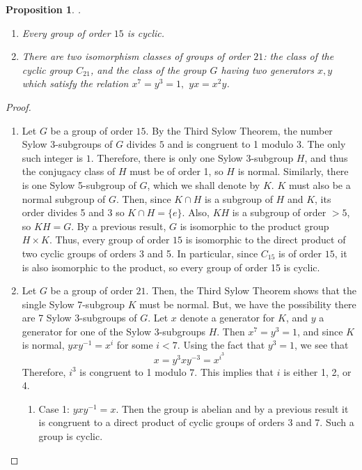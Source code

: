 \documentclass[12pt]{article}
\newtheorem{prop}[thm]{Proposition}
\theoremstyle{definition}
\theoremstyle{remark}
\numberwithin{equation}{section}
\begin{document}
\begin{prop}
        .\newline \begin{enumerate}
                \item Every group of order $15$ is cyclic.
                \item There are two isomorphism classes of groups of order $21$: the class of the cyclic group $C_{21}$, and the class of the group $G$ having two generators $x,y$ which satisfy the relation $x^7=y^3=1,$ $yx = x^2y$.
        \end{enumerate}
\end{prop}
\begin{proof}
        \begin{enumerate}
                \item Let $G$ be a group of order $15$. By the Third Sylow Theorem, the number Sylow 3-subgroups of $G$ divides $5$ and is congruent to 1 modulo 3. The only such integer is $1$. Therefore, there is only one Sylow 3-subgroup $H$, and thus the conjugacy class of $H$ must be of order 1, so $H$ is normal. Similarly, there is one Sylow 5-subgroup of $G$, which we shall denote by $K$. $K$ must also be a normal subgroup of $G$. Then, since $K\cap H$ is a subgroup of $H$ and $K$, its order divides 5 and 3 so $K \cap H = \{e\}$. Also, $KH$ is a subgroup of order $> 5$, so $KH = G$. By a previous result, $G$ is isomorphic to the product group $H\times K$. Thus, every group of order $15$ is isomorphic to the direct product of two cyclic groups of orders 3 and 5. In particular, since $C_{15}$ is of order $15$, it is also isomorphic to the product, so every group of order 15 is cyclic.
                \item Let $G$ be a group of order $21$. Then, the Third Sylow Theorem shows that the single Sylow 7-subgroup $K$ must be normal. But, we have the possibility there are 7 Sylow 3-subgroups of $G$. Let $x$ denote a generator for $K$, and $y$ a generator for one of the Sylow 3-subgroups $H$. Then $x^7 = y^3 = 1$, and since $K$ is normal, $yxy^{-1} = x^i$ for some $i < 7$. Using the fact that $y^3 = 1$, we see that \begin{equation}
                                x = y^3xy^{-3} = x^{i^3}
                \end{equation}
                        Therefore, $i^3$ is congruent to 1 modulo $7$. This implies that $i$ is either 1, 2, or 4.
                        \begin{enumerate}
                                \item[] Case 1: $yxy^{-1} = x$. Then the group is abelian and by a previous result it is congruent to a direct product of cyclic groups of orders 3 and 7. Such a group is cyclic.

\end{enumerate}
\end{enumerate}
\end{proof}
\end{document}
